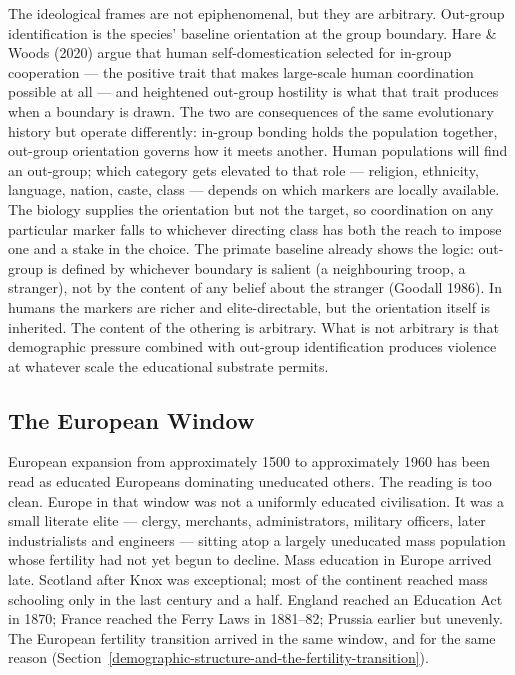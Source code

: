 \documentclass[12pt,letterpaper]{article}
\begin{document}
The ideological frames are not epiphenomenal, but they are arbitrary.
Out-group identification is the species' baseline orientation at the
group boundary. Hare \& Woods (2020) argue that human
self-domestication selected for in-group cooperation --- the positive
trait that makes large-scale human coordination possible at all ---
and heightened out-group hostility is what that trait produces when a
boundary is drawn. The two are consequences of the same evolutionary
history but operate differently: in-group bonding holds the population
together, out-group orientation governs how it meets another. Human
populations will find an out-group; which category gets elevated to
that role --- religion, ethnicity, language, nation, caste, class ---
depends on which markers are locally available. The biology supplies
the orientation but not the target, so coordination on any particular
marker falls to whichever directing class has both the reach to impose
one and a stake in the choice. The primate baseline already
shows the logic: out-group is defined by whichever boundary is salient
(a neighbouring troop, a stranger), not by the content of any
belief about the stranger (Goodall 1986). In humans the markers are
richer and elite-directable, but the orientation itself is inherited.
The content of the othering is arbitrary. What is not arbitrary is that demographic pressure combined
with out-group identification produces violence at whatever scale the
educational substrate permits.

\subsection{The European Window}\label{the-european-window}

European expansion from approximately 1500 to approximately 1960 has
been read as educated Europeans dominating uneducated others. The
reading is too clean. Europe in that window was not a uniformly
educated civilisation. It was a small literate elite --- clergy,
merchants, administrators, military officers, later industrialists and
engineers --- sitting atop a largely uneducated mass population whose
fertility had not yet begun to decline. Mass education in Europe
arrived late. Scotland after Knox was exceptional; most of the
continent reached mass schooling only in the last century and a half.
England reached an Education Act in 1870; France reached the Ferry
Laws in 1881--82; Prussia earlier but unevenly. The European fertility
transition arrived in the same window, and for the same reason
(Section~\ref{demographic-structure-and-the-fertility-transition}).
\end{document}
